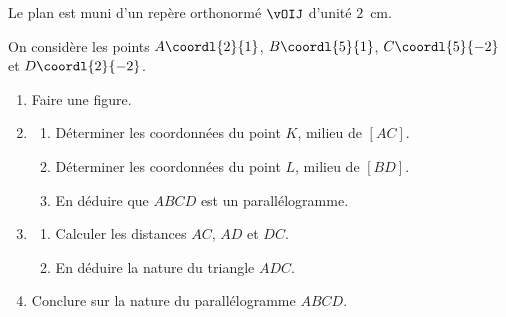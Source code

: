 \begin{exo}{}
	Le plan est muni d'un repère orthonormé $\vOIJ$ d'unité $2$~cm.

	On considère les points $A\coordl{2}{1}$, $B\coordl{5}{1}$, $C\coordl{5}{-2}$ et $D\coordl{2}{-2}$.

	\begin{enumerate}
		\item Faire une figure.
		\item
		      \begin{enumerate}
			      \item Déterminer les coordonnées du point $K$, milieu de $[AC]$.
			      \item Déterminer les coordonnées du point $L$, milieu de $[BD]$.
			      \item En déduire que $ABCD$ est un parallélogramme.
		      \end{enumerate}
		\item
		      \begin{enumerate}
			      \item Calculer les distances $AC$, $AD$ et $DC$.
			      \item En déduire la nature du triangle $ADC$.
		      \end{enumerate}
		\item Conclure sur la nature du parallélogramme $ABCD$.
	\end{enumerate}
\end{exo}
